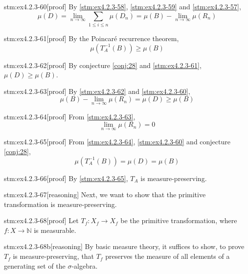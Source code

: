 \begin{stm}{stm:ex4.2.3-60}[proof]
By \ref{stm:ex4.2.3-58}, \ref{stm:ex4.2.3-59} and \ref{stm:ex4.2.3-57},
\[
\mu(D) = \lim_{n \to \infty} \sum_{1 \le i \le n} \mu(D_n) = \mu(B) - \lim_{n \to \infty} \mu(R_n)
\]
\end{stm}

\begin{stm}{stm:ex4.2.3-61}[proof]
By the Poincaré recurrence theorem, 
\[
\mu(T_A^{-1}(B)) \ge \mu(B)
\]
\end{stm}

\begin{stm}{stm:ex4.2.3-62}[proof]
By conjecture \ref{conj:28} and \ref{stm:ex4.2.3-61}, $\mu(D) \ge \mu(B)$.
\end{stm}

\begin{stm}{stm:ex4.2.3-63}[proof]
By \ref{stm:ex4.2.3-62} and \ref{stm:ex4.2.3-60}, 
\[
\mu(B) - \lim_{n \to \infty} \mu(R_n) = \mu(D) \ge \mu(B)
\]
\end{stm}

\begin{stm}{stm:ex4.2.3-64}[proof]
From \ref{stm:ex4.2.3-63}, 
\[
\lim_{n \to \infty} \mu(R_n) = 0
\]
\end{stm}

\begin{stm}{stm:ex4.2.3-65}[proof]
From \ref{stm:ex4.2.3-64}, \ref{stm:ex4.2.3-60} and conjecture \ref{conj:28},
\[
\mu(T_A^{-1}(B)) = \mu(D) = \mu(B)
\]
\end{stm}

\begin{stm}{stm:ex4.2.3-66}[proof]
By \ref{stm:ex4.2.3-65}, $T_A$ is measure-preserving.
\end{stm}

\begin{stm}{stm:ex4.2.3-67}[reasoning]
Next, we want to show that the primitive transformation is measure-preserving.
\end{stm}

\begin{stm}{stm:ex4.2.3-68}[proof]
Let $T_f : X_f \to X_f$ be the primitive transformation, where $f : X \to \mathbb{N}$ is measurable.
\end{stm}

\begin{stm}{stm:ex4.2.3-68b}[reasoning]
By basic measure theory, it suffices to show, to prove $T_f$ is measure-preserving, that $T_f$ preserves the measure of all elements of a generating set of the $\sigma$-algebra.
\end{stm}


